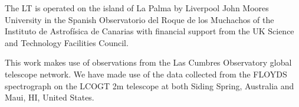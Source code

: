\documentclass[linenumbers, twocolumn]{aastex631}
\begin{document}
The LT is operated on the island of La Palma by Liverpool
John Moores University in the Spanish Observatorio del Roque
de los Muchachos of the Instituto de Astrof{\'i}sica de Canarias with
financial support from the UK Science and Technology Facilities
Council.

This work makes use of observations from the Las Cumbres Observatory
global telescope network. We have made use of the data collected from
the FLOYDS spectrograph on the LCOGT 2m telescope at both Siding Spring,
Australia and Maui, HI, United States.


{}



\end{document}
